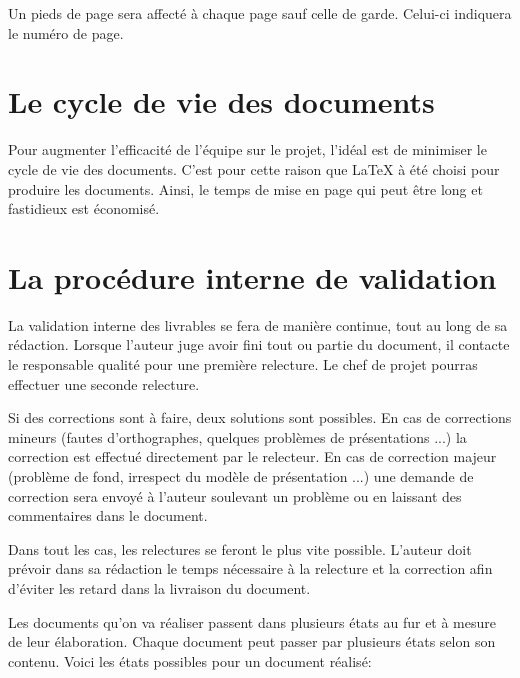      Un pieds de page sera affecté à chaque page sauf celle de garde.
     Celui-ci indiquera le numéro de page.

\section{Le cycle de vie des documents}

Pour augmenter l'efficacité de l'équipe sur le projet, l’idéal est de minimiser le cycle de vie des documents.
C'est pour cette raison que LaTeX à été choisi pour produire les documents. Ainsi, le temps de mise en page qui peut être long et fastidieux est économisé.


\section{La procédure interne de validation}

La validation interne des livrables se fera de manière continue, tout au long de sa rédaction.
Lorsque l’auteur juge avoir fini tout ou partie du document, il contacte le responsable qualité pour une première relecture. Le chef de projet pourras effectuer une seconde relecture.

Si des corrections sont à faire, deux solutions sont possibles.
En cas de corrections mineurs (fautes d’orthographes, quelques problèmes de présentations ...) la correction est effectué directement par le relecteur.
En cas de correction majeur (problème de fond, irrespect du modèle de présentation ...) une demande de correction sera envoyé à l’auteur soulevant un problème ou en laissant des commentaires dans le document.

Dans tout les cas, les relectures se feront le plus vite possible.
L’auteur doit prévoir dans sa rédaction le temps nécessaire à la relecture et la correction afin d’éviter les retard dans la livraison du document.

Les documents qu'on va réaliser passent dans plusieurs états au fur et à mesure de leur élaboration. Chaque document peut passer par plusieurs états selon son contenu. Voici les états possibles pour un document réalisé:



